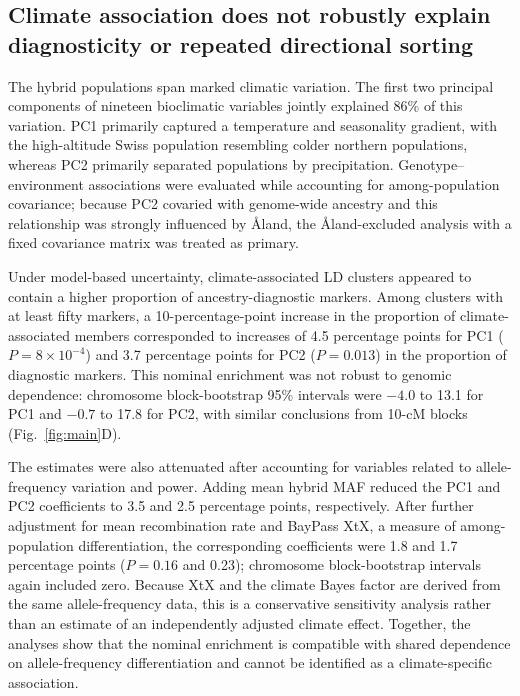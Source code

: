 \documentclass[11pt]{article}
\begin{document}
\subsection*{Climate association does not robustly explain diagnosticity or repeated directional sorting}

The hybrid populations span marked climatic variation. The first two
principal components of nineteen bioclimatic variables jointly explained 86\%
of this variation. PC1 primarily captured a temperature and seasonality
gradient, with the high-altitude Swiss population resembling colder northern
populations, whereas PC2 primarily separated populations by precipitation.
Genotype--environment associations were evaluated while accounting for
among-population covariance; because PC2 covaried with genome-wide ancestry and
this relationship was strongly influenced by \AA{}land, the
\AA{}land-excluded analysis with a fixed covariance matrix was treated as
primary.

Under model-based uncertainty, climate-associated LD clusters appeared to
contain a higher proportion of ancestry-diagnostic markers. Among clusters
with at least fifty markers, a 10-percentage-point increase in the proportion
of climate-associated members corresponded to increases of 4.5 percentage
points for PC1 (\(P=8\times10^{-4}\)) and 3.7 percentage points for PC2
(\(P=0.013\)) in the proportion of diagnostic markers. This nominal enrichment
was not robust to genomic dependence: chromosome block-bootstrap 95\%
intervals were \(-4.0\) to 13.1 for PC1 and \(-0.7\) to 17.8 for PC2, with
similar conclusions from 10-cM blocks (Fig.~\ref{fig:main}D).

The estimates were also attenuated after accounting for variables related to
allele-frequency variation and power. Adding mean hybrid MAF reduced the PC1
and PC2 coefficients to 3.5 and 2.5 percentage points, respectively. After
further adjustment for mean recombination rate and BayPass XtX, a measure of
among-population differentiation, the corresponding coefficients were 1.8 and
1.7 percentage points (\(P=0.16\) and 0.23); chromosome block-bootstrap
intervals again included zero. Because XtX and the climate Bayes factor are
derived from the same allele-frequency data, this is a conservative
sensitivity analysis rather than an estimate of an independently adjusted
climate effect. Together, the analyses show that the nominal enrichment is
compatible with shared dependence on allele-frequency differentiation and
cannot be identified as a climate-specific association.
\end{document}
